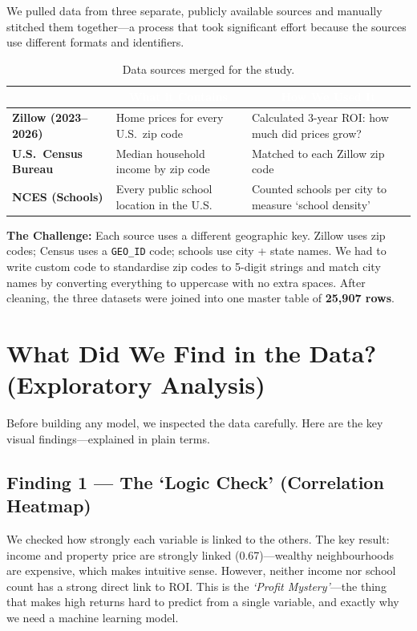 \documentclass[12pt, a4paper]{article}
\newcommand{\hrow}{\rowcolor{rowblue}}
\begin{document}
We pulled data from three separate, publicly available sources and manually stitched them together---a process
that took significant effort because the sources use different formats and identifiers.

\begin{table}[H]
\centering
\renewcommand{\arraystretch}{1.4}
\begin{tabularx}{\linewidth}{>{\bfseries}p{3.5cm} p{5.5cm} X}
\toprule
\rowcolor{headerblue}
\multicolumn{1}{c}{\textcolor{white}{\textbf{Source}}} &
\multicolumn{1}{c}{\textcolor{white}{\textbf{What it Contains}}} &
\multicolumn{1}{c}{\textcolor{white}{\textbf{How We Used It}}} \\
\midrule
Zillow (2023--2026) & Home prices for every U.S.\ zip code & Calculated 3-year ROI: how much did prices grow? \\
\hrow U.S.\ Census Bureau & Median household income by zip code & Matched to each Zillow zip code \\
NCES (Schools) & Every public school location in the U.S.\ & Counted schools per city to measure `school density' \\
\bottomrule
\end{tabularx}
\caption{Data sources merged for the study.}
\end{table}

\textbf{The Challenge:} Each source uses a different geographic key. Zillow uses zip codes; Census uses a
\texttt{GEO\_ID} code; schools use city + state names. We had to write custom code to standardise zip codes to
5-digit strings and match city names by converting everything to uppercase with no extra spaces. After cleaning,
the three datasets were joined into one master table of \textbf{25,907 rows}.

\section{What Did We Find in the Data? (Exploratory Analysis)}

Before building any model, we inspected the data carefully. Here are the key visual findings---explained in plain terms.

\subsection*{Finding 1 --- The `Logic Check' (Correlation Heatmap)}

We checked how strongly each variable is linked to the others. The key result: income and property price are
strongly linked (0.67)---wealthy neighbourhoods are expensive, which makes intuitive sense. However, neither
income nor school count has a strong direct link to ROI. This is the \textit{`Profit Mystery'}---the thing that
makes high returns hard to predict from a single variable, and exactly why we need a machine learning model.
\end{document}

